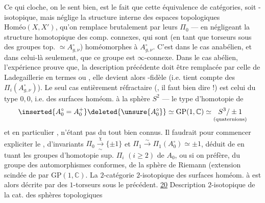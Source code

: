 Ce qui cloche, on le sent bien, est
le fait que cette équivalence de catégories,
soit -isotopique, mais néglige la
structure  interne des espaces topologiques
 $\mathrm{Homéo}(X,X')$, qu'on remplace
brutalement par leurs $\Pi_0$ --- en négligeant
la structure homotopique des comp.
connexes, qui sont (en tant que torseurs
sous des groupes top. $\simeq A_{g,\nu}^{\circ}$) homéomorphes
à $A_{g,\nu}^{\circ}$. C'est  dans le cas
anabélien, et dans celui-là seulement,
que ce groupe est $\infty$-connexe. Dans
le cas abélien, l'expérience prouve que,
la description précédente doit être remplacée
par celle de Ladegaillerie en termes 
 ou ,  elle
devient alors  \unsure{$\infty$}-fidèle (i.e. tient compte
des $\Pi_i(A_{g,\nu}^{\circ})$). Le seul cas
entièrement réfractaire (, il
faut bien dire !) est celui du type $0,0$, i.e.
des surfaces homéom. à la sphère $S^2$
--- le type d'homotopie de 
\[
\inserted{A_0^\circ=A_0^+}\deleted{\unsure{A_0^\circ}}
\simeq \mathrm{GP}(1,\mathbb C)\simeq
\underset{(\text{quaternions})}{S^3/\pm1}
\]
et en particulier  , n'étant pas du
tout bien connus. Il faudrait pour
commencer  expliciter le
 , d'invariants $\Pi_0\xrightarrow[\sim]{\chi}\{\pm1\}$ et
$\Pi_1\xrightarrow{\sim}\Pi_1(A_0^\circ)\simeq\pm1$, déduit de 
en tuant les groupes d'homotopie sup.
$\Pi_i$ $(i\geq2)$ de $A_0$, ou si on préfère,
du groupe des automorphismes conformes,
de la sphère de Riemann (extension
scindée de  par $\mathrm{GP}(1,\mathbb C)$.
La $2$-catégorie
$2$-isotopique des surfaces homéom. à 
 est alors décrite par  des
$1$-torseurs sous le  précédent.
\uline{20} Description $2$-isotopique de la cat. des sphères topologiques

